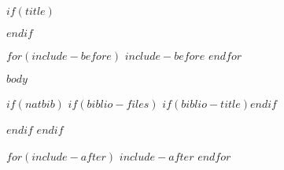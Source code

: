 \documentclass[$if(fontsize)$$fontsize$,$endif$$if(lang)$$lang$,$endif$$if(papersize)$$papersize$,$endif$$for(classoption)$$classoption$$sep$,$endfor$]{$documentclass$}
\renewcommand{\refname}{\bfseries\large\uppercase{references}}
\begin{document}
\begin{spacing}{1.1}
\raggedright

$if(title)$\maketitle$endif$
\thispagestyle{empty}

$for(include-before)$
$include-before$
$endfor$

$body$

\end{spacing}

$if(natbib)$
$if(biblio-files)$
$if(biblio-title)$\renewcommand\refname{$biblio-title$}$endif$

$endif$
$endif$

$for(include-after)$
$include-after$
$endfor$
\end{document}
